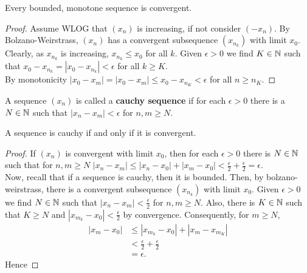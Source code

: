 \begin{proposition}
	Every bounded, monotone sequence is convergent.
\end{proposition}
\begin{proof}
	Assume WLOG that \(\left(x_{n} \right)\) is increasing, if not consider \(\left( -x_{n} \right) \). By Bolzano-Weirstrass, \(\left( x_{n} \right) \) has a convergent subsequence \(\left( x_{n_{k}} \right)\) with limit \(x_0\). Clearly, as \(x_{n_{k}}\) is increasing, \(x_{n_{k}} \le x_0\) for all \(k\). Given \(\epsilon > 0\) we find \(K \in \mathbb{N}\) such that \(x_0 - x_{n_{k}} = \left| x_0 - x_{n_{k}} \right|  < \epsilon\) for all \(k \ge K\).\\
	By monotonicity \(\left| x_0 - x_{m} \right| = \left| x_0 - x_{m} \right|  \le x_0 - x_{n_{K}} < \epsilon \) for all \(n \ge n_{K}\).
\end{proof}
\begin{definition}
	A sequence \(\left( x_{n} \right) \) is called a \textbf{cauchy sequence} if for each \(\epsilon > 0\) there is a \(N \in \mathbb{N}\) such that \(\left| x_{n} - x_{m} \right| < \epsilon \) for \(n, m \ge N\).
\end{definition}
\begin{theorem}
	A sequence is cauchy if and only if it is convergent.
\end{theorem}
\begin{proof}
	If \(\left( x_{n} \right) \) is convergent with limit \(x_0\), then for each \( \epsilon > 0\) there is \(N \in \mathbb{N}\) such that for \(n, m \ge N\) \(\left|  x_{n} - x_{m}\right|  \le \left| x_{n} - x_0 \right|  + \left| x_{m} - x_0  \right|  < \frac{\epsilon}{2} + \frac{\epsilon}{2} = \epsilon\).\\
	Now, recall that if a sequence is cauchy, then it is bounded. Then, by bolzano-weirstrass, there is a convergent subsequence \(\left( x_{n_{k}} \right) \) with limit \(x_0\). Given \( \epsilon > 0\) we find \(N \in \mathbb{N}\) such that \(\left| x_{n} - x_{m} \right|  < \frac{\epsilon}{2}\) for \(n, m \ge N\). Also, there is \(K \in \mathbb{N}\) such that \(K \ge N\) and \(\left| x_{m_{k}} - x_0 \right| < \frac{\epsilon}{2} \) by convergence. Consequently, for \(m \ge N\),
	\begin{align*}
		\left| x_{m} - x_0 \right| &\le \left| x_{m_{k}} - x_0 \right|  + \left| x_{m} - x_{m_{K}} \right|  \\
					   &< \frac{\epsilon}{2} + \frac{\epsilon}{2}\\
					   &=  \epsilon
	.\end{align*}
Hence
\end{proof}
